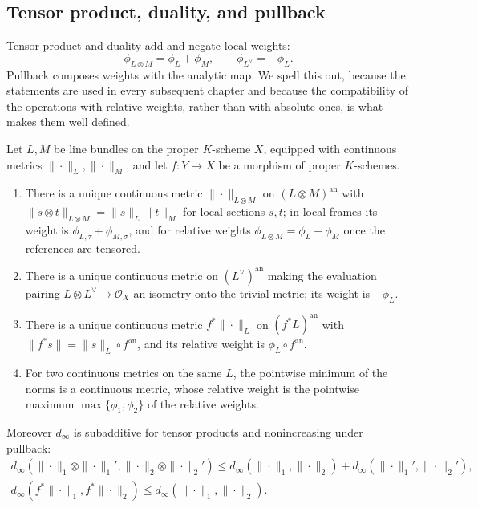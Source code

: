 \subsection{Tensor product, duality, and pullback}

Tensor product and duality add and negate local weights:
\[
 \phi_{L\otimes M}=\phi_L+\phi_M,\qquad
 \phi_{L^\vee}=-\phi_L.
\]
Pullback composes weights with the analytic map. We spell this out, because
the statements are used in every subsequent chapter and because the
compatibility of the operations with relative weights, rather than with
absolute ones, is what makes them well defined.

\begin{proposition}
\label{prop:metrics-operations}
Let $L,M$ be line bundles on the proper $K$-scheme $X$, equipped with
continuous metrics $\|\cdot\|_L,\|\cdot\|_M$, and let $f:Y\to X$ be a
morphism of proper $K$-schemes.
\begin{enumerate}
\item There is a unique continuous metric $\|\cdot\|_{L\otimes M}$ on
$(L\otimes M)^{\mathrm{an}}$ with
$\|s\otimes t\|_{L\otimes M}=\|s\|_L\|t\|_M$ for local sections $s,t$;
in local frames its weight is $\phi_{L,\tau}+\phi_{M,\sigma}$, and for
relative weights $\phi_{L\otimes M}=\phi_L+\phi_M$ once the references are
tensored.
\item There is a unique continuous metric on $(L^\vee)^{\mathrm{an}}$
making the evaluation pairing $L\otimes L^\vee\to\mathcal O_X$ an isometry
onto the trivial metric; its weight is $-\phi_L$.
\item There is a unique continuous metric $f^*\|\cdot\|_L$ on
$(f^*L)^{\mathrm{an}}$ with $\|f^*s\|=\|s\|_L\circ f^{\mathrm{an}}$, and
its relative weight is $\phi_L\circ f^{\mathrm{an}}$.
\item For two continuous metrics on the same $L$, the pointwise minimum of
the norms is a continuous metric, whose relative weight is the pointwise
maximum $\max\{\phi_1,\phi_2\}$ of the relative weights.
\end{enumerate}
Moreover $d_\infty$ is subadditive for tensor products and nonincreasing
under pullback:
\[
\begin{gathered}
 d_\infty(\|\cdot\|_1\otimes\|\cdot\|_1',\|\cdot\|_2\otimes\|\cdot\|_2')
 \le d_\infty(\|\cdot\|_1,\|\cdot\|_2)
   +d_\infty(\|\cdot\|_1',\|\cdot\|_2'),\\
 d_\infty(f^*\|\cdot\|_1,f^*\|\cdot\|_2)\le
 d_\infty(\|\cdot\|_1,\|\cdot\|_2).
\end{gathered}
\]
\end{proposition}

